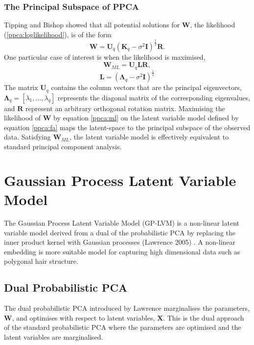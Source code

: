 \documentclass[ %
author={Dillon Keith Diep},
supervisor={Dr. Carl Henrik Ek},
degree={MEng},
title={ART-CG Hair:},
subtitle={Assisted Real-time Content Generation of Stylised Virtual Hair},
type={Research},
year={2017} ]{dissertation}
\begin{document}
\subsubsection{The Principal Subspace of PPCA}
Tipping and Bishop showed that all potential solutions for $\bm{W}$, the likelihood (\ref{ppca:loglikelihood}), is of the form \cite{ppca} $$\bm{W}=\bm{U}_q(\bm{K}_q-\sigma^2\bm{I})^\frac{1}{2}\bm{R}.$$
One particular case of interest is when the likelihood is maximised,
\begin{equation} \label{ppca:ml}
\bm{W}_{ML}=\bm{U}_q\bm{LR},
\end{equation}
$$\bm{L}=(\bm{\Lambda}_q-\sigma^2\bm{I})^{\frac{1}{2}}$$
The matrix $\bm{U}_q$ contains the column vectors that are the principal eigenvectors, $\bm{\Lambda}_q=[\lambda_1,...,\lambda_q]$ represents the diagonal matrix of the corresponding eigenvalues, and $\bm{R}$ represent an arbitrary orthogonal rotation matrix. 
Maximising the likelihood of $\bm{W}$ by equation \ref{ppca:ml} on the latent variable model defined by equation \ref{ppca:fa} maps the latent-space to the principal subspace of the observed data. Satisfying $\bm{W}_{ML}$, the latent variable model is effectively equivalent to standard principal component analysis.

\section{Gaussian Process Latent Variable Model}
The Gaussian Process Latent Variable Model (GP-LVM) is a non-linear latent variable model derived from a dual of the probabilistic PCA by replacing the inner product kernel with Gaussian processes (Lawrence 2005) \cite{gplvm}. A non-linear embedding is more suitable model for capturing high dimensional data such as polygonal hair structure.
	
\subsection{Dual Probabilistic PCA}
The dual probabilistic PCA introduced by Lawrence marginalises the parameters, $\bm{W}$, and optimises with respect to latent variables, $\bm{X}$. This is the dual approach of the standard probabilistic PCA where the parameters are optimised and the latent variables are marginalised.
\end{document}
